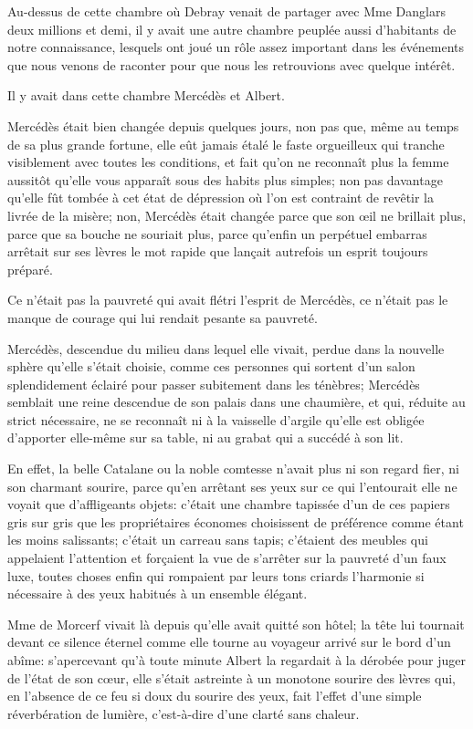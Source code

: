 Au-dessus de cette chambre où Debray venait de partager avec Mme Danglars deux millions et demi, il y avait une autre chambre peuplée aussi d'habitants de notre connaissance, lesquels ont joué un rôle assez important dans les événements que nous venons de raconter pour que nous les retrouvions avec quelque intérêt. 

Il y avait dans cette chambre Mercédès et Albert. 

Mercédès était bien changée depuis quelques jours, non pas que, même au temps de sa plus grande fortune, elle eût jamais étalé le faste orgueilleux qui tranche visiblement avec toutes les conditions, et fait qu'on ne reconnaît plus la femme aussitôt qu'elle vous apparaît sous des habits plus simples; non pas davantage qu'elle fût tombée à cet état de dépression où l'on est contraint de revêtir la livrée de la misère; non, Mercédès était changée parce que son œil ne brillait plus, parce que sa bouche ne souriait plus, parce qu'enfin un perpétuel embarras arrêtait sur ses lèvres le mot rapide que lançait autrefois un esprit toujours préparé. 

Ce n'était pas la pauvreté qui avait flétri l'esprit de Mercédès, ce n'était pas le manque de courage qui lui rendait pesante sa pauvreté. 

Mercédès, descendue du milieu dans lequel elle vivait, perdue dans la nouvelle sphère qu'elle s'était choisie, comme ces personnes qui sortent d'un salon splendidement éclairé pour passer subitement dans les ténèbres; Mercédès semblait une reine descendue de son palais dans une chaumière, et qui, réduite au strict nécessaire, ne se reconnaît ni à la vaisselle d'argile qu'elle est obligée d'apporter elle-même sur sa table, ni au grabat qui a succédé à son lit. 

En effet, la belle Catalane ou la noble comtesse n'avait plus ni son regard fier, ni son charmant sourire, parce qu'en arrêtant ses yeux sur ce qui l'entourait elle ne voyait que d'affligeants objets: c'était une chambre tapissée d'un de ces papiers gris sur gris que les propriétaires économes choisissent de préférence comme étant les moins salissants; c'était un carreau sans tapis; c'étaient des meubles qui appelaient l'attention et forçaient la vue de s'arrêter sur la pauvreté d'un faux luxe, toutes choses enfin qui rompaient par leurs tons criards l'harmonie si nécessaire à des yeux habitués à un ensemble élégant. 

Mme de Morcerf vivait là depuis qu'elle avait quitté son hôtel; la tête lui tournait devant ce silence éternel comme elle tourne au voyageur arrivé sur le bord d'un abîme: s'apercevant qu'à toute minute Albert la regardait à la dérobée pour juger de l'état de son cœur, elle s'était astreinte à un monotone sourire des lèvres qui, en l'absence de ce feu si doux du sourire des yeux, fait l'effet d'une simple réverbération de lumière, c'est-à-dire d'une clarté sans chaleur. 

